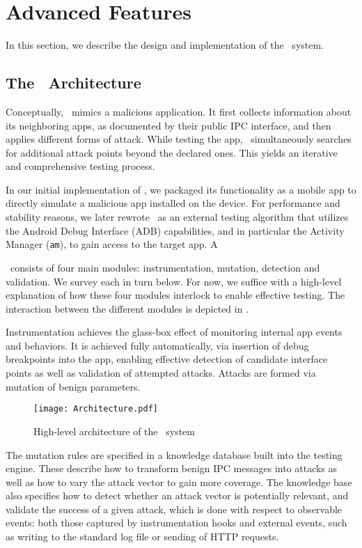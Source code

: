 \section{Advanced Features}

In this section, we describe the design and implementation of the \Tool\ system.

\subsection{The \Tool\ Architecture}

Conceptually, \Tool\ mimics a malicious application. It first collects information about its neighboring apps, as documented by their public IPC interface, and then applies different forms of attack. While testing the app, \Tool\ simultaneously searches for additional attack points beyond the declared ones. This yields an iterative and comprehensive testing process. 

In our initial implementation of \Tool, we packaged its functionality as a mobile app to directly simulate a malicious app installed on the device. For performance and stability reasons, we later rewrote \Tool\ as an external testing algorithm that utilizes the Android Debug Interface (ADB) capabilities, and in particular the Activity Manager ({\tt am}), to gain access to the target app. A 

\Tool\ consists of four main modules: instrumentation, mutation, detection and validation. We survey each in turn below. For now, we suffice with a high-level explanation of how these four modules interlock to enable effective testing. The interaction between the different modules is depicted in .

Instrumentation achieves the glass-box effect of monitoring internal app events and behaviors. It is achieved fully automatically, via insertion of debug breakpoints into the app, enabling effective detection of candidate interface points as well as validation of attempted attacks. Attacks are formed via mutation of benign parameters. 

\begin{figure}
\texttt{[image: Architecture.pdf]}
\caption{\label{Fi:architecture}High-level architecture of the \Tool\ system}
\end{figure}

The mutation rules are specified in a knowledge database built into the testing engine. These describe how to transform benign IPC messages into attacks as well as how to vary the attack vector to gain more coverage. The knowledge base also specifies how to detect whether an attack vector is potentially relevant, and validate the success of a given attack, which is done with respect to observable events: both those captured by instrumentation hooks and external events, such as writing to the standard log file or sending of HTTP requests.

